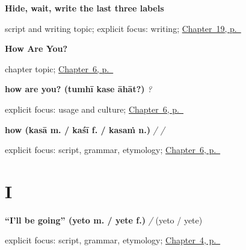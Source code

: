 \noindent\begin{minipage}[t]{\linewidth}
\raggedright
\textbf{Hide, wait, write the last three labels}\par
\footnotesize script and writing topic; explicit focus: writing; \hyperref[ch:mr-a1-form-labels]{Chapter~19, p.~\pageref*{ch:mr-a1-form-labels}}
\end{minipage}\par\smallskip

\noindent\begin{minipage}[t]{\linewidth}
\raggedright
\textbf{How Are You?}\par
\footnotesize chapter topic; \hyperref[ch:responding]{Chapter~6, p.~\pageref*{ch:responding}}
\end{minipage}\par\smallskip

\noindent\begin{minipage}[t]{\linewidth}
\raggedright
\textbf{how are you? (tumhī kase āhāt?)}\enspace\emph{  ?}\par
\footnotesize explicit focus: usage and culture; \hyperref[ch:responding]{Chapter~6, p.~\pageref*{ch:responding}}
\end{minipage}\par\smallskip

\noindent\begin{minipage}[t]{\linewidth}
\raggedright
\textbf{how (kasā m. / kaśī f. / kasaṁ n.)}\enspace\emph{ /  / }\par
\footnotesize explicit focus: script, grammar, etymology; \hyperref[ch:responding]{Chapter~6, p.~\pageref*{ch:responding}}
\end{minipage}\par\smallskip

\section*{I}

\noindent\begin{minipage}[t]{\linewidth}
\raggedright
\textbf{\textquotedblleft{}I'll be going\textquotedblright{} (yeto m. / yete f.)}\enspace\emph{ / }\enspace(yeto / yete)\par
\footnotesize explicit focus: script, grammar, etymology; \hyperref[ch:greetings]{Chapter~4, p.~\pageref*{ch:greetings}}
\end{minipage}\par\smallskip

